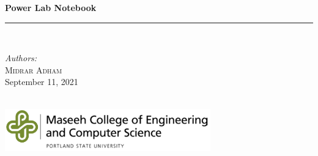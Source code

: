 \documentclass[hidelinks, 12pt]{article} %
\begin{document}
\pagestyle{fancy}



\begin{titlepage}
\newcommand{\HRule}{\rule{\linewidth}{0.5mm}} %
\center %

{ \huge \bfseries Power Lab Notebook \\[0.4cm] } %
\HRule \\[1.5cm]



\begin{minipage}{0.4\textwidth}
\large
\emph{Authors:}\\
\textsc{Midrar Adham}\\

{\large September 11, 2021} 
\end{minipage}\\[0.5cm]
\vfill %
\includegraphics[width=3.5in]{psuMCECSlogo_horiz.png}
\vfill

\end{titlepage}
\end{document}
